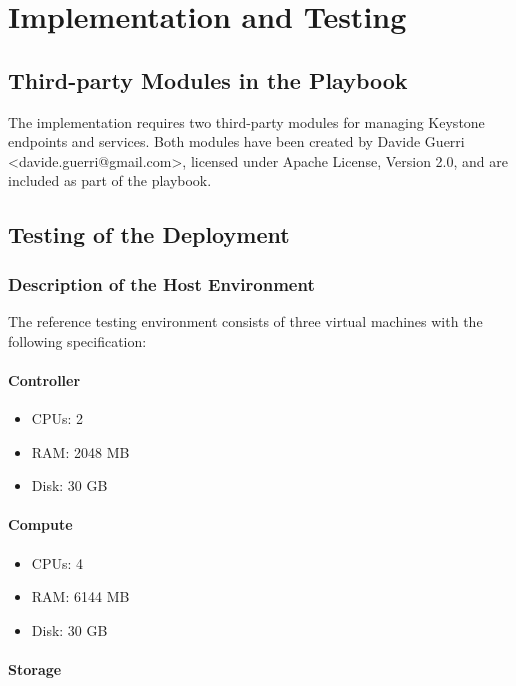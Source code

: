 \chapter{Implementation and Testing}
\label{ch:testing}


\section{Third-party Modules in the Playbook}

The implementation requires two third-party modules for managing Keystone endpoints and services. Both modules have been created by Davide Guerri <davide.guerri@gmail.com>, licensed under Apache License, Version 2.0, and are included as part of the playbook.

\section{Testing of the Deployment}
\subsection{Description of the Host Environment}

The reference testing environment consists of three virtual machines with the following specification:

\subsubsection*{Controller}

\begin{itemize}
  \item{CPUs: 2}
  \item{RAM: 2048 MB}
  \item{Disk: 30 GB}
\end{itemize}

\subsubsection*{Compute}

\begin{itemize}
  \item{CPUs: 4}
  \item{RAM: 6144 MB}
  \item{Disk: 30 GB}
\end{itemize}

\subsubsection*{Storage}

